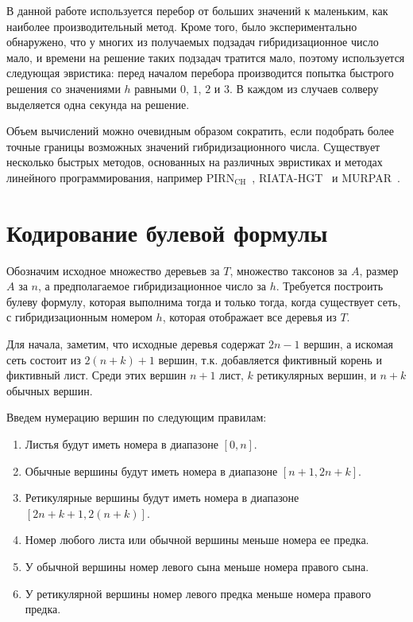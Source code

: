 В данной работе используется перебор от больших значений к маленьким, как наиболее производительный метод.
Кроме того, было экспериментально обнаружено, что у многих из получаемых подзадач гибридизационное число мало, и времени на решение таких подзадач тратится мало, поэтому используется следующая эвристика: перед началом перебора производится попытка быстрого решения со значениями $h$ равными $0$, $1$, $2$ и $3$. В каждом из случаев солверу выделяется одна секунда на решение.


Объем вычислений можно очевидным образом сократить, если подобрать более точные границы возможных значений гибридизационного числа.
Существует несколько быстрых методов, основанных на различных эвристиках и методах линейного программирования, например PIRN$\mathrm{_{CH}}$~\cite{wu2010close}, RIATA-HGT~\cite{nakhleh2005riata} и MURPAR~\cite{park2012murpar}.

\FloatBarrier
\section{Кодирование булевой формулы}

Обозначим исходное множество деревьев за $T$, множество таксонов за $A$, размер $A$ за $n$, а предполагаемое гибридизационное число за $h$. Требуется построить булеву формулу, которая выполнима тогда и только тогда, когда существует сеть, с гибридизационным номером $h$, которая отображает все деревья из $T$.

Для начала, заметим, что исходные деревья содержат $2 n - 1$ вершин, а искомая сеть состоит из $2 (n + k) + 1$ вершин, т.к. добавляется фиктивный корень и фиктивный лист. Среди этих вершин $n + 1$ лист, $k$ ретикулярных вершин, и $n + k$ обычных вершин.

Введем нумерацию вершин по следующим правилам:

\begin{enumerate}
	\item Листья будут иметь номера в диапазоне $[0, n]$.
	\item Обычные вершины будут иметь номера в диапазоне $[n + 1, 2n + k]$.
	\item Ретикулярные вершины будут иметь номера в диапазоне $[2n + k + 1, 2(n + k)]$.
	\item Номер любого листа или обычной вершины меньше номера ее предка.
	\item У обычной вершины номер левого сына меньше номера правого сына.
	\item У ретикулярной вершины номер левого предка меньше номера правого предка.
\end{enumerate}

